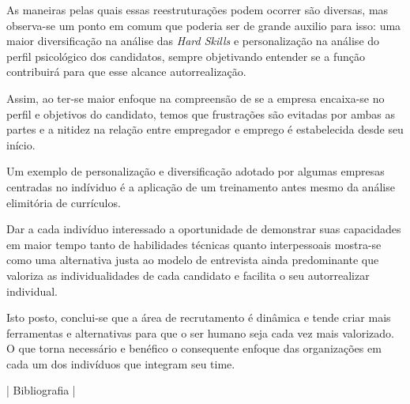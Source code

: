 \documentclass[12pt]{article}
\begin{document}
As maneiras pelas quais essas reestruturações podem ocorrer são diversas, mas observa-se um ponto em comum que poderia ser de grande auxilio para isso: uma maior diversificação na análise das \emph{Hard Skills} e personalização na análise do perfil psicológico dos candidatos, sempre objetivando entender se a função contribuirá para que esse alcance autorrealização.

Assim, ao ter-se maior enfoque na compreensão de se a empresa encaixa-se no perfil e objetivos do candidato, temos que frustrações são evitadas por ambas as partes e a nitidez na relação entre empregador e emprego é estabelecida desde seu início. 

Um exemplo de personalização e diversificação adotado por algumas empresas centradas no indíviduo é a aplicação de um treinamento antes mesmo da análise elimitória de currículos. 

Dar a cada indivíduo interessado a oportunidade de demonstrar suas capacidades em maior tempo tanto de habilidades técnicas quanto interpessoais mostra-se como uma alternativa justa ao modelo de entrevista ainda predominante que valoriza as individualidades de cada candidato e facilita o seu autorrealizar individual. 

Isto posto, conclui-se que a área de recrutamento é dinâmica e tende criar mais ferramentas e alternativas para que o ser humano seja cada vez mais valorizado. O que torna necessário e benéfico o consequente enfoque das organizações em cada um dos indivíduos que integram seu time. 

| Bibliografia |
\end{document}
